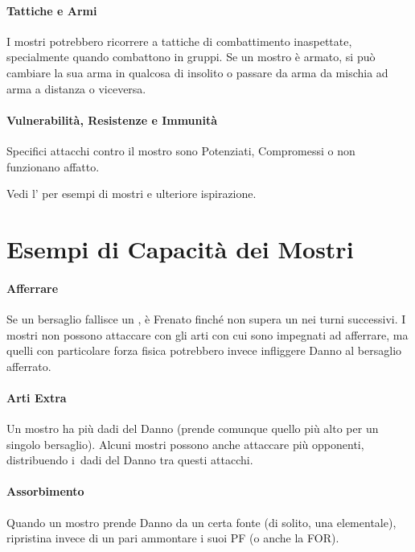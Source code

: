 \documentclass[itdr]{subfiles}
\begin{document}
\vfill
\paragraph{Tattiche e Armi}
I mostri potrebbero ricorrere a tattiche di combattimento inaspettate, specialmente quando combattono in gruppi. Se un mostro è armato, si può cambiare la sua arma in qualcosa di insolito o passare da arma da mischia ad arma a distanza o viceversa.

\vfill
\paragraph{Vulnerabilità, Resistenze e Immunità}
Specifici attacchi contro il mostro sono Potenziati, Compromessi o non funzionano affatto.

\vfill
\begin{dbox}
	Vedi l'\textbf{} per esempi di mostri e ulteriore ispirazione.
\end{dbox}

\vfill
\break

\section{Esempi di Capacità dei Mostri}

\paragraph{Afferrare}
Se un bersaglio fallisce un , è Frenato finché non supera un  nei turni successivi. I mostri non possono attaccare con gli arti con cui sono impegnati ad afferrare, ma quelli con particolare forza fisica potrebbero invece infliggere Danno al bersaglio afferrato.

\vfill
\paragraph{Arti Extra}
Un mostro ha più dadi del Danno (prende comunque quello più alto per un singolo bersaglio). Alcuni mostri possono anche attaccare più opponenti, distribuendo i~dadi del Danno tra questi attacchi.

\vfill
\paragraph{Assorbimento}
Quando un mostro prende Danno da un certa fonte (di solito, una elementale), ripristina invece di un pari ammontare i suoi PF (o anche la FOR).
\end{document}

